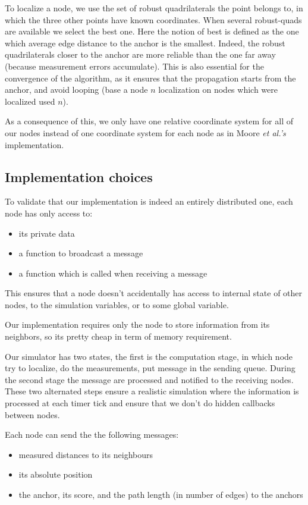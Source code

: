 \documentclass[letterpaper, 10 pt, conference]{ieeeconf}  %
\begin{document}
To localize a node, we use the set of robust quadrilaterals the point belongs to, in which the three other points have known coordinates. When several robust-quads are available we select the best one. Here the notion of best is defined as the one which average edge distance to the anchor is the smallest. Indeed, the robust quadrilaterals closer to the anchor are more reliable than the one far away (because measurement errors accumulate). This is also essential for the convergence of the algorithm, as it ensures that the propagation starts from the anchor, and avoid looping (base a node $n$ localization on nodes which were localized used $n$).

As a consequence of this, we only have one relative coordinate system for all of our nodes instead of one coordinate system for each node as in Moore \emph{et al.'s} implementation. 

\subsection{Implementation choices}

To validate that our implementation is indeed an entirely distributed one, each node has only access to:
\begin{itemize}
    \item its private data
    \item a function to broadcast a message
    \item a function which is called when receiving a message
\end{itemize}

This ensures that a node doesn't accidentally has access to internal state of other nodes, to the simulation variables, or to some global variable. 

Our implementation requires only the node to store information from its neighbors, so its pretty cheap in term of memory requirement.

Our simulator has two states, the first is the computation stage, in which node try to localize, do the measurements, put message in the sending queue. During the second stage the message are processed and notified to the receiving nodes. These two alternated steps ensure a realistic simulation where the information is processed at each timer tick and ensure that we don't do hidden callbacks between nodes. 

Each node can send the the following messages:

\begin{itemize}
    \item measured distances to its neighbours
    \item its absolute position
    \item the anchor, its score, and the path length (in number of edges) to the anchors
\end{itemize}
\end{document}
